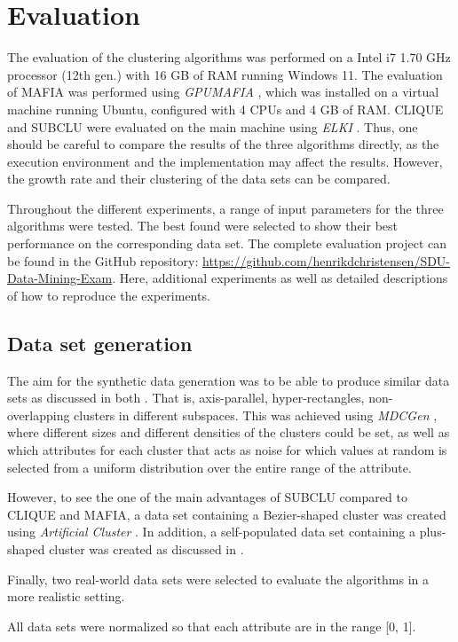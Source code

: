 \section{Evaluation}
The evaluation of the clustering algorithms was performed on a Intel i7 1.70 GHz processor (12th gen.) with 16 GB of RAM running Windows 11. The evaluation of MAFIA was performed using \textit{GPUMAFIA} \cite{gpumafia}, which was installed on a virtual machine running Ubuntu, configured with 4 CPUs and 4 GB of RAM. CLIQUE and SUBCLU were evaluated on the main machine using \textit{ELKI} \cite{elki}. Thus, one should be careful to compare the results of the three algorithms directly, as the execution environment and the implementation may affect the results. However, the growth rate and their clustering of the data sets can be compared.

Throughout the different experiments, a range of input parameters for the three algorithms were tested. The best found were selected to show their best performance on the corresponding data set. The complete evaluation project can be found in the GitHub repository: \url{https://github.com/henrikdchristensen/SDU-Data-Mining-Exam}. Here, additional experiments as well as detailed descriptions of how to reproduce the experiments.

\subsection{Data set generation}
The aim for the synthetic data generation was to be able to produce similar data sets as discussed in both \cite{clique,mafia}. That is, axis-parallel, hyper-rectangles, non-overlapping clusters in different subspaces. This was achieved using \textit{MDCGen} \cite{mdcgen}, where different sizes and different densities of the clusters could be set, as well as which attributes for each cluster that acts as noise for which values at random is selected from a uniform distribution over the entire range of the attribute.

However, to see the one of the main advantages of SUBCLU compared to CLIQUE and MAFIA, a data set containing a Bezier-shaped cluster was created using \textit{Artificial Cluster} \cite{ac}. In addition, a self-populated data set containing a plus-shaped cluster was created as discussed in \cite{mafia}.

Finally, two real-world data sets were selected to evaluate the algorithms in a more realistic setting.

All data sets were normalized so that each attribute are in the range [0, 1].

